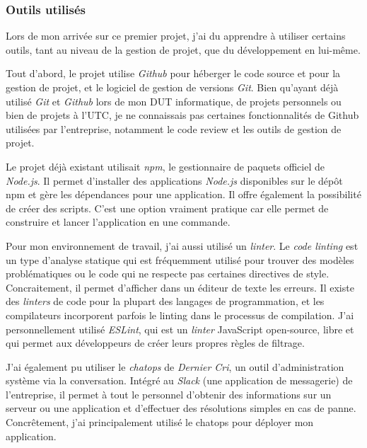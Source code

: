 \bigskip

\subsubsection{Outils utilisés}\label{outils-utilisuxe9s}

\bigskip

Lors de mon arrivée sur ce premier projet, j'ai du apprendre à utiliser
certains outils, tant au niveau de la gestion de projet, que du
développement en lui-même.

\bigskip

Tout d'abord, le projet utilise \emph{Github} pour héberger le code
source et pour la gestion de projet, et le logiciel de gestion de
versions \emph{Git}. Bien qu'ayant déjà utilisé \emph{Git} et
\emph{Github} lors de mon DUT informatique, de projets personnels ou
bien de projets à l'UTC, je ne connaissais pas certaines fonctionnalités
de Github utilisées par l'entreprise, notamment le code review et les
outils de gestion de projet.

\bigskip

Le projet déjà existant utilisait \emph{npm}, le gestionnaire de paquets
officiel de \emph{Node.js}. Il permet d'installer des applications
\emph{Node.js} disponibles sur le dépôt npm et gère les dépendances pour
une application. Il offre également la possibilité de créer des scripts.
C'est une option vraiment pratique car elle permet de construire et
lancer l'application en une commande.

\bigskip

Pour mon environnement de travail, j'ai aussi utilisé un \emph{linter}.
Le \emph{code linting} est un type d'analyse statique qui est
fréquemment utilisé pour trouver des modèles problématiques ou le code
qui ne respecte pas certaines directives de style. Concraitement, il
permet d'afficher dans un éditeur de texte les erreurs. Il existe des
\emph{linters} de code pour la plupart des langages de programmation, et
les compilateurs incorporent parfois le linting dans le processus de
compilation. J'ai personnellement utilisé \emph{ESLint}, qui est un
\emph{linter} JavaScript open-source, libre et qui permet aux
développeurs de créer leurs propres règles de filtrage.

\bigskip

J'ai également pu utiliser le \emph{chatops} de \emph{Dernier Cri}, un
outil d'administration système via la conversation. Intégré au
\emph{Slack} (une application de messagerie) de l'entreprise, il permet
à tout le personnel d'obtenir des informations sur un serveur ou une
application et d'effectuer des résolutions simples en cas de panne.
Concrêtement, j'ai principalement utilisé le chatops pour déployer mon
application.

